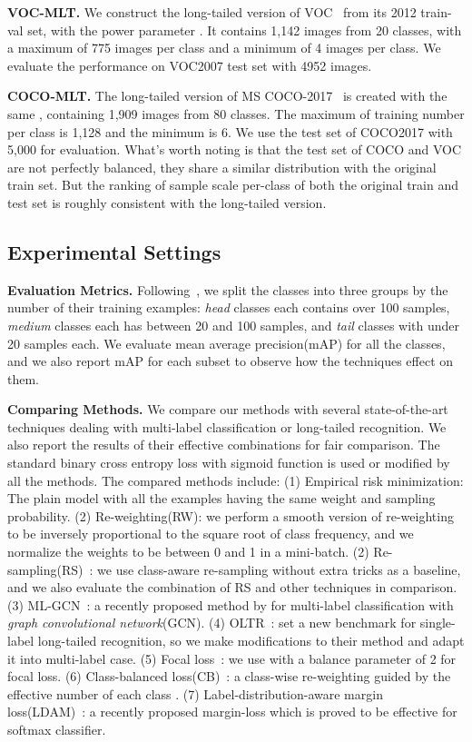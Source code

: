 \documentclass[runningheads]{llncs}
\begin{document}
\noindent\textbf{VOC-MLT.} 
We construct the long-tailed version of VOC~\cite{Everingham2015voc} from its 2012 train-val set, with the power parameter .
It contains 1,142 images from 20 classes, with a maximum of 775 images per class and a minimum of 4 images per class.
We evaluate the performance on VOC2007 test set with 4952 images.
 
\noindent\textbf{COCO-MLT.}
The long-tailed version of MS COCO-2017~\cite{lin2014coco} is created with the same , containing 1,909 images from 80 classes. 
The maximum of training number per class is 1,128 and the minimum is 6. We use the test set of COCO2017 with 5,000 for evaluation. 
What's worth noting is that the test set of COCO and VOC are not perfectly balanced, they share a similar distribution with the original train set. But the ranking of sample scale per-class of both the original train and test set is roughly consistent with the long-tailed version.


\subsection{Experimental Settings}

\noindent\textbf{Evaluation Metrics.}
Following~\cite{liu2019largescale}, we split the classes into three groups by the number of their training examples: \textit{head} classes each contains over 100 samples, \textit{medium} classes each has between 20 and 100 samples, and \textit{tail} classes with under 20 samples each. 
We evaluate mean average precision(mAP) for all the classes, and we also report mAP for each subset to observe how the techniques effect on them.

\noindent\textbf{Comparing Methods.}
We compare our methods with several state-of-the-art techniques dealing with multi-label classification or long-tailed recognition. We also report the results of their effective combinations for fair comparison.
The standard binary cross entropy loss with sigmoid function is used or modified by all the methods. 
The compared methods include:
(1) Empirical risk minimization: The plain model with all the examples having the same weight and sampling probability. 
(2) Re-weighting(RW): we perform a smooth version of re-weighting to be inversely proportional to the square root of class frequency, and we normalize the weights to be between 0 and 1 in a mini-batch.
(2) Re-sampling(RS)~\cite{shen2016relay}: we use class-aware re-sampling without extra tricks as a baseline, and we also evaluate the combination of RS and other techniques in comparison.
(3) ML-GCN~\cite{chen2019mlgcn}: a recently proposed method by for multi-label classification with \textit{graph convolutional network}(GCN).
(4) OLTR~\cite{liu2019largescale}: set a new benchmark for single-label long-tailed recognition, so we make modifications to their method and adapt it into multi-label case. 
(5) Focal loss~\cite{lin2017focal}: we use  with a balance parameter of 2 for focal loss.
(6) Class-balanced loss(CB)~\cite{cui2019cb}: a class-wise re-weighting guided by the effective number of each class . 
(7) Label-distribution-aware margin loss(LDAM)~\cite{cao2019ldam}: a recently proposed margin-loss which is proved to be effective for softmax classifier.
\end{document}
